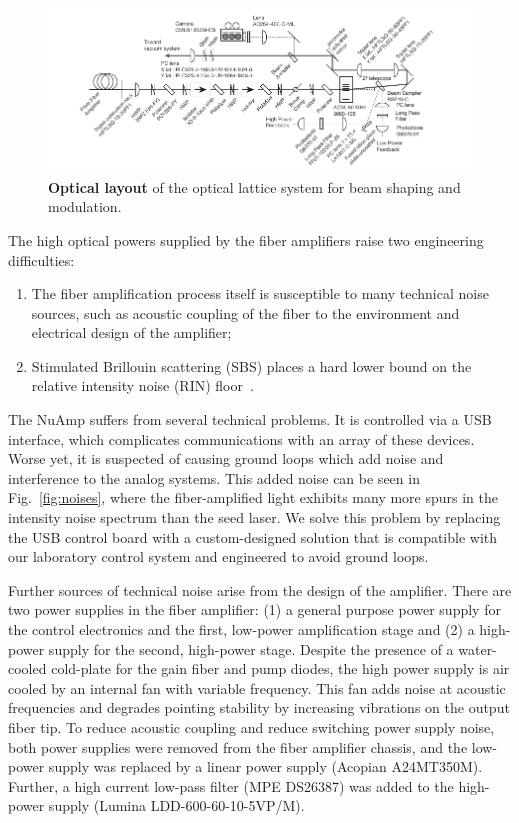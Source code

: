 \documentclass[twocolumn,aps,pra,showpacs,preprintnumbers,bibnotes]{revtex4-1}
\begin{document}
\begin{figure}[t]
  \begin{center}
    \includegraphics{Figure3.pdf}
    \caption{\textbf{Optical layout} of the optical lattice system for beam shaping and modulation.}\label{fig:optical_layout}
  \end{center}
\end{figure}

The high optical powers supplied by the fiber amplifiers raise two engineering difficulties:
\begin{enumerate}
  \item The fiber amplification process itself is susceptible to many technical noise sources, such as acoustic coupling of the fiber to the environment and electrical design of the amplifier;
  \item Stimulated Brillouin scattering (SBS) places a hard lower bound on the relative intensity noise (RIN) floor~\cite{Agrawal2013}.
\end{enumerate}

The NuAmp suffers from several technical problems.
It is controlled via a USB interface, which complicates communications with an array of these devices.
Worse yet, it is suspected of causing ground loops which add noise and interference to the analog systems.
This added noise can be seen in Fig.~\ref{fig:noises}, where the fiber-amplified light exhibits many more spurs in the intensity noise spectrum than the seed laser.
We solve this problem by replacing the USB control board with a custom-designed solution  that is compatible with our laboratory control system and engineered to avoid ground loops.


Further sources of technical noise arise from the design of the amplifier. There are two power supplies in the fiber amplifier: (1) a general purpose power supply for the control electronics and the first, low-power amplification stage and (2) a high-power supply for the second, high-power stage.
Despite the presence of a water-cooled cold-plate for the gain fiber and pump diodes, the high power supply is air cooled by an internal fan with variable frequency.
This fan adds noise at acoustic frequencies and degrades pointing stability by increasing vibrations on the output fiber tip.
To reduce acoustic coupling and reduce switching power supply noise, both power supplies were removed from the fiber amplifier chassis, and the low-power supply was replaced by a linear power supply (Acopian A24MT350M).
Further, a high current low-pass filter (MPE DS26387) was added to the high-power supply (Lumina LDD-600-60-10-5VP/M).
\end{document}
